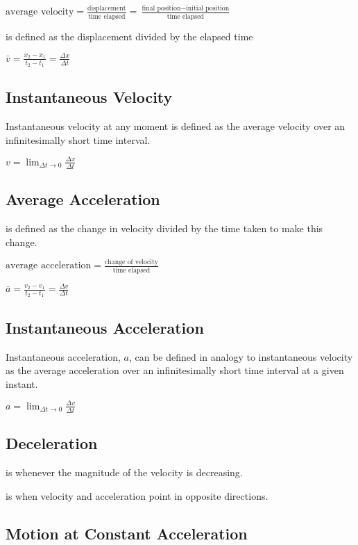 \documentclass{extarticle}
\begin{document}
$\text{average velocity} = \frac{ \text{displacement} }{ \text{time elapsed} } = \frac{ \text{final position} - \text{initial position} }{ \text{time elapsed} }$


is defined as the displacement divided by the elapsed time

$\bar{v} = \frac{x_2 - x_1}{t_2 - t_1} = \frac{\Delta x}{\Delta t}$


\subsection{Instantaneous Velocity}
Instantaneous velocity at any moment is defined as the average velocity over an infinitesimally short time interval.

$v = \lim_{\Delta t \to 0} \frac{\Delta x}{\Delta t}$

\subsection{Average Acceleration}
is defined as the change in velocity divided by the time taken to make this change.

$\text{average acceleration} = \frac{\text{change of velocity}}{\text{time elapsed}}$

$\bar{a} = \frac{v_2 - v_1}{t_2 - t_1} = \frac{\Delta v}{\Delta t}$

\subsection{Instantaneous Acceleration}
Instantaneous acceleration, $a$, can be defined in analogy to instantaneous
velocity as the average acceleration over an infinitesimally short time interval at
a given instant.

$a = \lim_{\Delta t \to 0} \frac{\Delta v}{\Delta t}$



\subsection{Deceleration}
is whenever the magnitude of the velocity is decreasing.

is when velocity and acceleration point in opposite directions.






\markStart[100]


\subsection{Motion at Constant Acceleration}
\end{document}
